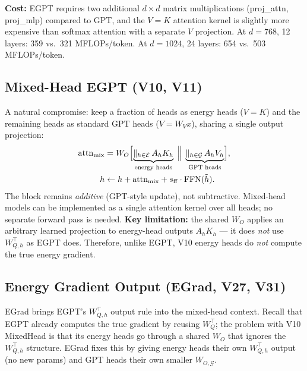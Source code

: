 \textbf{Cost:} EGPT requires two additional $d{\times}d$ matrix multiplications
(proj\_attn, proj\_mlp) compared to GPT, and the $V{=}K$ attention kernel is slightly
more expensive than softmax attention with a separate $V$ projection.
At $d=768$, 12 layers: 359 vs.\ 321 MFLOPs/token.
At $d=1024$, 24 layers: 654 vs.\ 503 MFLOPs/token.

\subsection{Mixed-Head EGPT (V10, V11)}

A natural compromise: keep a fraction of heads as energy heads ($V{=}K$) and
the remaining heads as standard GPT heads ($V{=}W_V x$), sharing a single output projection:
\begin{align}
  \mathrm{attn}_{\mathrm{mix}} &= W_O \Bigl[
    \underbrace{\|_{h \in \mathcal{E}}\, A_h K_h}_{\text{energy heads}}
    \;\Big\|\;
    \underbrace{\|_{h \in \mathcal{G}}\, A_h V_h}_{\text{GPT heads}}
  \Bigr], \\
  h &\leftarrow h + \mathrm{attn}_{\mathrm{mix}} + s_{\mathrm{ff}} \cdot \mathrm{FFN}(\tilde{h}). \label{eq:mixed_update}
\end{align}
The block remains \emph{additive} (GPT-style update), not subtractive.
Mixed-head models can be implemented as a single attention kernel over all heads;
no separate forward pass is needed.
\textbf{Key limitation:} the shared $W_O$ applies an arbitrary learned projection to
energy-head outputs $A_h K_h$ --- it does \emph{not} use $W_{Q,h}^\top$ as EGPT does.
Therefore, unlike EGPT, V10 energy heads do \emph{not} compute the true energy gradient.

\subsection{Energy Gradient Output (EGrad, V27, V31)}

EGrad brings EGPT's $W_{Q,h}^\top$ output rule into the mixed-head context.
Recall that EGPT already computes the true gradient by reusing $W_Q^\top$;
the problem with V10 MixedHead is that its energy heads go through a shared $W_O$
that ignores the $W_{Q,h}^\top$ structure.
EGrad fixes this by giving energy heads their own $W_{Q,h}^\top$ output (no new params)
and GPT heads their own smaller $W_{O,\mathcal{G}}$.

